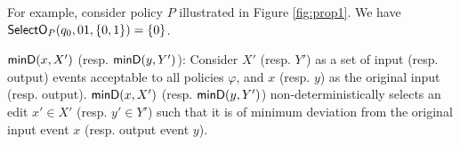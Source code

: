 For example, consider policy $P$ illustrated in Figure \ref{fig:prop1}. We have $\mathsf{SelectO}_{P}(q_0, 01, \{0,1\}) = \{0\}$.

%




{\boldmath$\mathsf{{minD}}(x, X')$ (resp. \boldmath$\mathsf{{minD}}(y, Y')$)}: Consider $X'$ (resp. $Y'$) as a set of input (resp. output) events acceptable to all policies $\varphi$, and $x$ (resp. $y$) as the original input (resp. output). $\mathsf{{minD}}(x, X')$ (resp. $\mathsf{{minD}}(y, Y')$) non-deterministically selects an edit $x' \in X'$ (resp. $y' \in Y'$) such that it is of minimum deviation from the original input event $x$ (resp. output event $y$).

